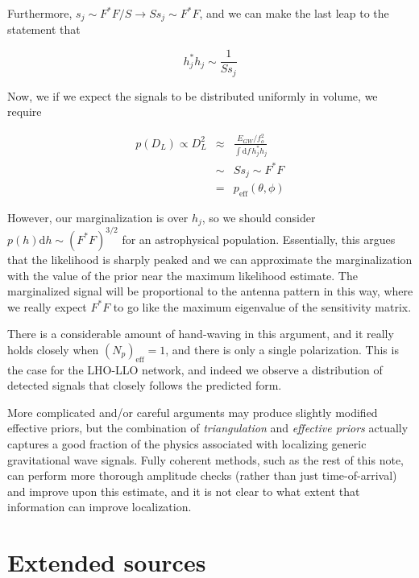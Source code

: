 \documentclass[10pt]{article}
\begin{document}
Furthermore, $s_j\sim F^\ast F/ S \rightarrow S s_j \sim F^\ast F$, and we can make the last leap to the statement that

\begin{equation}
h_{j}^\ast h_{j} \sim \frac{1}{S s_j}
\end{equation}

Now, we if we expect the signals to be distributed uniformly in volume, we require

\begin{eqnarray}
p(D_L) \propto D_L^2 & \approx & \frac{E_{GW}/f_o^2}{\int\mathrm{d}f\, h_{j}^\ast h_{j}} \\
                     & \sim & S s_j \sim F^\ast F \\
                     & = & p_{\mathrm{eff}}(\theta,\phi)
\end{eqnarray}

However, our marginalization is over $h_j$, so we should consider $p(h)\mathrm{d}h\sim(F^\ast F)^{3/2}$ for an astrophysical population. Essentially, this argues that the likelihood is sharply peaked and we can approximate the marginalization with the value of the prior near the maximum likelihood estimate. The marginalized signal will be proportional to the antenna pattern in this way, where we really expect $F^\ast F$ to go like the maximum eigenvalue of the sensitivity matrix.

There is a considerable amount of hand-waving in this argument, and it really holds closely when $\left(N_{p}\right)_{\mathrm{eff}} = 1$, and there is only a single polarization. This is the case for the LHO-LLO network, and indeed we observe a distribution of detected signals that closely follows the predicted form. 

More complicated and/or careful arguments may produce slightly modified effective priors, but the combination of \emph{triangulation} and \emph{effective priors} actually captures a good fraction of the physics associated with localizing generic gravitational wave signals. Fully coherent methods, such as the rest of this note, can perform more thorough amplitude checks (rather than just time-of-arrival) and improve upon this estimate, and it is not clear to what extent that information can improve localization.

\section{Extended sources}\label{section:extended sources}
\end{document}
